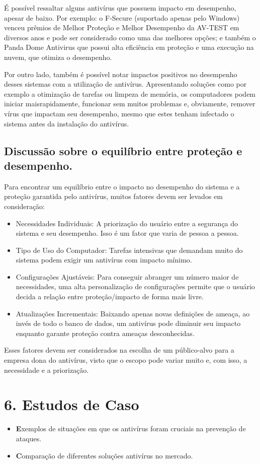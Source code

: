 \documentclass[10pt,conference,twocolumn]{article}
\begin{document}
É possível ressaltar alguns antivírus que possuem impacto em desempenho, apesar de baixo. Por exemplo: o F-Secure (suportado apenas pelo Windows) venceu prêmios de Melhor Proteção e Melhor Desempenho da AV-TEST em diversos anos e pode ser considerado como uma das melhores opções; e também o Panda Dome Antivirus que possui alta eficiência em proteção e uma execução na nuvem, que otimiza o desempenho.

Por outro lado, também é possível notar impactos positivos no desempenho desses sistemas com a utilização de antivírus. Apresentando soluções como por exemplo a otimização de tarefas ou limpeza de memória, os computadores podem iniciar maisrapidamente, funcionar sem muitos problemas e, obviamente, remover vírus que impactam seu desempenho, mesmo que estes tenham infectado o sistema antes da instalação do antivírus.

\subsection*{Discussão sobre o equilíbrio entre proteção e desempenho.}
Para encontrar um equilíbrio entre o impacto no desempenho do sistema e a proteção garantida pelo antivírus, muitos fatores devem ser levados em consideração:
\begin{itemize}
\item
Necessidades Individuais:
A priorização do usuário entre a segurança do sistema e seu desempenho. Isso é um fator que varia de pessoa a pessoa.
\item
Tipo de Uso do Computador: 
Tarefas intensivas que demandam muito do sistema podem exigir um antivírus com impacto mínimo.
\item
Configurações Ajustáveis: 
Para conseguir abranger um número maior de necessidades, uma alta personalização de configurações permite que o usuário decida a relação entre proteção/impacto de forma mais livre.
\item
Atualizações Incrementais: 
Baixando apenas novas definições de ameaça, ao invés de todo o banco de dados, um antivírus pode diminuir seu impacto enquanto garante proteção contra ameaças desconhecidas.
\end{itemize}

Esses fatores devem ser considerados na escolha de um público-alvo para a empresa dona do antivírus, visto que o escopo pode variar muito e, com isso, a necessidade e a priorização.

\section*{6. Estudos de Caso}
 \begin{itemize}
\item \textbf Exemplos de situações em que os antivírus foram cruciais na prevenção de ataques.
\item \textbf Comparação de diferentes soluções antivírus no mercado.
\end{itemize}
\end{document}
